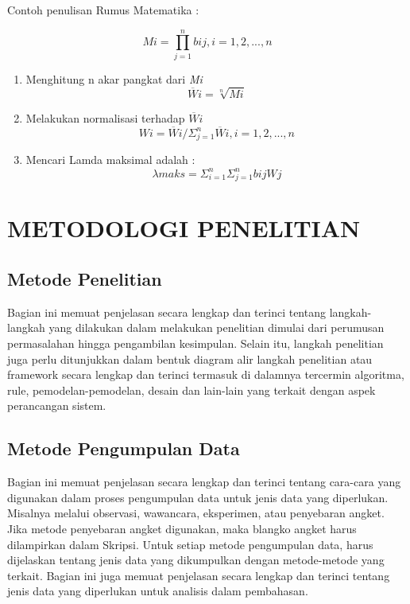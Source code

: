 \documentclass[oneside,listof=totoc]{scrbook}
\begin{document}
\vspace{0.5cm}

\noindent Contoh penulisan Rumus Matematika :

\begin{equation}
Mi = \prod_{j=1}^n bij,i=1,2,...,n
\end{equation}

\begin{enumerate}
\item Menghitung n akar pangkat dari \textit{Mi}
  \begin{equation}
  \overline{W}i = \sqrt[n]{Mi}
  \end{equation}

\item Melakukan normalisasi terhadap $ \overline{W}i $
  \begin{equation}
  Wi = \overline{W}i / \Sigma_{j=1}^n \overline{W}i,i = 1,2,...,n
  \end{equation}

\item Mencari Lamda maksimal adalah :
  \begin{equation}
  \lambda maks = \Sigma_{i=1}^n \Sigma_{j=1}^n bijWj
  \end{equation}
\end{enumerate}

\chapter{METODOLOGI PENELITIAN}

\vspace{0.5cm}

\section{Metode Penelitian}
Bagian ini memuat penjelasan secara lengkap dan terinci tentang langkah-langkah yang dilakukan dalam melakukan penelitian dimulai dari perumusan permasalahan hingga pengambilan kesimpulan. Selain itu, langkah penelitian juga perlu ditunjukkan dalam bentuk diagram alir langkah penelitian atau framework secara lengkap dan terinci termasuk di dalamnya tercermin algoritma, rule, pemodelan-pemodelan, desain dan lain-lain yang terkait dengan aspek perancangan sistem.

\section{Metode Pengumpulan Data}
Bagian ini memuat penjelasan secara lengkap dan terinci tentang cara-cara yang digunakan dalam proses pengumpulan data untuk jenis data yang diperlukan. Misalnya melalui observasi, wawancara, eksperimen, atau penyebaran angket. Jika metode penyebaran angket digunakan, maka blangko angket harus dilampirkan dalam Skripsi. Untuk setiap metode pengumpulan data, harus dijelaskan tentang jenis data yang dikumpulkan dengan metode-metode yang terkait. Bagian ini juga memuat penjelasan secara lengkap dan terinci tentang jenis data yang diperlukan untuk analisis dalam pembahasan.
\end{document}
